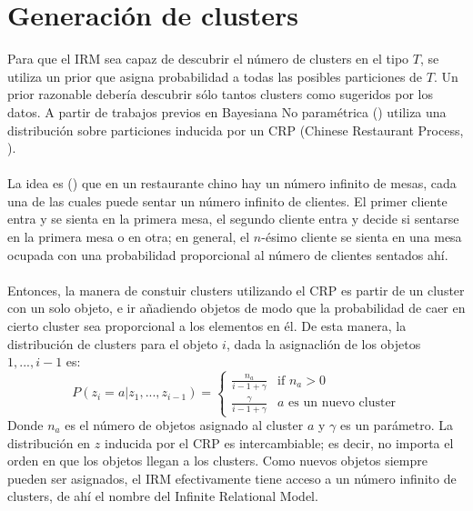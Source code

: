 \documentclass[11pt]{article}
\theoremstyle{plain}
\begin{document}
\section{Generación de clusters}
Para que el IRM sea capaz de descubrir el número de clusters en el tipo $T$, se utiliza un prior que asigna probabilidad a todas las posibles particiones de $T$. Un prior razonable debería descubrir sólo tantos clusters como sugeridos por los datos. A partir de trabajos previos en Bayesiana No paramétrica (\cite{rasmussen2000infinite}) utiliza una distribución sobre particiones inducida por un CRP  (Chinese Restaurant Process, \cite{teh2011dirichlet}).\\
\\
La idea es (\cite{teh2011dirichlet}) que en un restaurante chino hay un número infinito de mesas, cada una de las cuales puede sentar un número infinito de clientes. El primer cliente entra y se sienta en la primera mesa, el segundo cliente entra y decide si sentarse en la primera mesa o en otra; en general, el $n$-ésimo cliente se sienta en una mesa ocupada con una probabilidad proporcional al número de clientes sentados ahí.\\
\\
Entonces, la manera de constuir clusters utilizando el CRP es partir de un cluster con un solo objeto, e ir añadiendo objetos de modo que la probabilidad de caer en cierto cluster sea proporcional a los elementos en él. De esta manera, la distribución de clusters para el objeto $i$, dada la asignaclión de los objetos $1,...,i-1$ es:
\[
  P(z_i = a | z_1, ... , z_{i-1}) =
  \begin{cases}
                                   \frac{n_a}{i-1+\gamma} & \text{if $n_a > 0$} \\
                                   \frac{\gamma}{i-1+\gamma} & \text{$a$ es un nuevo cluster} 
  \end{cases}
\]
Donde $n_a$ es el número de objetos asignado al cluster $a$ y $\gamma$ es un parámetro. La distribución en $z$ inducida por el CRP es intercambiable; es decir, no importa el orden en que los objetos llegan a los clusters. Como nuevos objetos siempre pueden ser asignados, el IRM efectivamente tiene acceso a un número infinito de clusters, de ahí el nombre del Infinite Relational Model.
\end{document}
